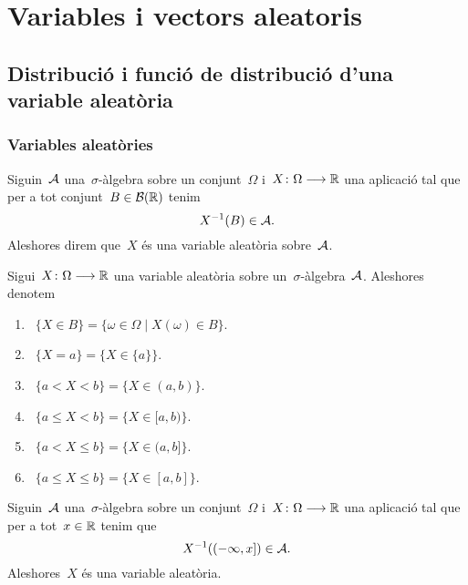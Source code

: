 \documentclass[../probabilitat.tex]{subfiles}
\begin{document}
\chapter{Variables i vectors aleatoris}
\section{Distribució i funció de distribució d'una variable aleatòria}
\subsection{Variables aleatòries}
    \begin{definition}
        \label{def:variable-aleatoria}
        Siguin~\(\mathcal{A}\) una~\(\sigma\)-àlgebra sobre un conjunt~\(\Omega\) i~\(X\colon\Omega\longrightarrow\mathbb{R}\) una aplicació tal que per a tot conjunt~\(B\in\mathcal{B}(\mathbb{R})\) tenim
        \[
            X^{-1}(B)\in\mathcal{A}.
        \]
        Aleshores direm que~\(X\) és una variable aleatòria sobre~\(\mathcal{A}\).
    \end{definition}
    \begin{example}
    \end{example}
    \begin{notation}
        \label{notation:variables-aleatories}
        Sigui~\(X\colon\Omega\longrightarrow\mathbb{R}\) una variable aleatòria sobre un~\(\sigma\)-àlgebra~\(\mathcal{A}\).
        Aleshores denotem
        \begin{enumerate}
            \item~\(\{X\in B\}=\{\omega\in\Omega\mid X(\omega)\in B\}\).
            \item~\(\{X=a\}=\{X\in\{a\}\}\).
            \item~\(\{a< X<b\}=\{X\in(a,b)\}\).
            \item~\(\{a\leq X<b\}=\{X\in[a,b)\}\).
            \item~\(\{a< X\leq b\}=\{X\in(a,b]\}\).
            \item~\(\{a\leq X\leq b\}=\{X\in[a,b]\}\).
        \end{enumerate}
    \end{notation}
    \begin{proposition}
        \label{prop:condicio-suficient-per-ser-una-variable-aleatoria}
        Siguin~\(\mathcal{A}\) una~\(\sigma\)-àlgebra sobre un conjunt~\(\Omega\) i~\(X\colon\Omega\longrightarrow\mathbb{R}\) una aplicació tal que per a tot~\(x\in\mathbb{R}\) tenim que
        \[
            X^{-1}((-\infty,x])\in\mathcal{A}.
        \]
        Aleshores~\(X\) és una variable aleatòria.
    \end{proposition}
\end{document}
